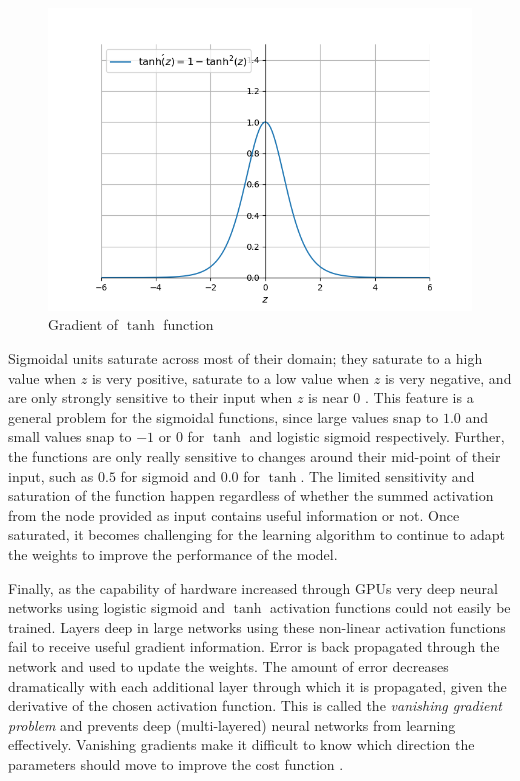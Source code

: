 \documentclass[12pt]{report}
\numberwithin{equation}{section}
\begin{document}
\begin{figure}[htb!]
\centering 
\includegraphics[scale=0.9]{png/tanh_prime.png} 
\caption{Gradient of $\tanh$ function}
\label{fig:tanh_prime}
\end{figure}

Sigmoidal units saturate across most of their domain; they saturate to a high value when $z$ is very positive, saturate to a low value when $z$ is very negative, and are only strongly sensitive to their input when $z$ is near $0$ \textbf{\cite[p.~195]{10.5555/3086952}}. This feature is a general problem for the sigmoidal functions, since large values snap to $1.0$ and small values snap to $-1$ or $0$ for $\tanh$ and logistic sigmoid respectively. Further, the functions are only really sensitive to changes around their mid-point of their input, such as $0.5$ for sigmoid and $0.0$ for $\tanh$. The limited sensitivity and saturation of the function happen regardless of whether the summed activation from the node provided as input contains useful information or not. Once saturated, it becomes challenging for the learning algorithm to continue to adapt the weights to improve the performance of the model. 

Finally, as the capability of hardware increased through GPUs very deep neural networks using logistic sigmoid and $\tanh$ activation functions could not easily be trained. Layers deep in large networks using these non-linear activation functions fail to receive useful gradient information. Error is back propagated through the network and used to update the weights. The amount of error decreases dramatically with each additional layer through which it is propagated, given the derivative of the chosen activation function. This is called the \textit{vanishing gradient problem} and prevents deep (multi-layered) neural networks from learning effectively. Vanishing gradients make it difficult to know which direction the parameters should move to improve the cost function \textbf{\cite[p.~290]{10.5555/3086952}}.
\end{document}
